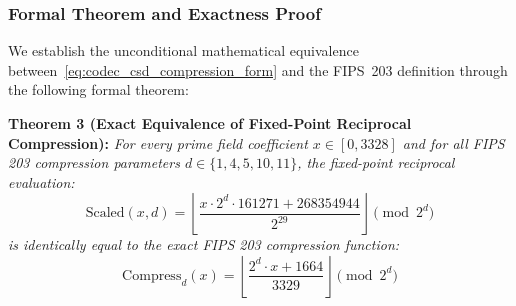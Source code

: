\subsubsection{Formal Theorem and Exactness Proof}
We establish the unconditional mathematical equivalence between~\eqref{eq:codec_csd_compression_form} and the FIPS~203 definition through the following formal theorem:

\vspace{4pt}
\noindent\textbf{Theorem 3 (Exact Equivalence of Fixed-Point Reciprocal Compression):}
\textit{For every prime field coefficient $x \in [0, 3328]$ and for all FIPS 203 compression parameters $d \in \{1, 4, 5, 10, 11\}$, the fixed-point reciprocal evaluation:}
\begin{equation}
\label{eq:codec_theorem3_stmt}
\text{Scaled}(x, d) = \left\lfloor \frac{x \cdot 2^d \cdot 161271 + 268354944}{2^{29}} \right\rfloor \pmod{2^d}
\end{equation}
\textit{is identically equal to the exact FIPS 203 compression function:}
\begin{equation}
\text{Compress}_d(x) = \left\lfloor \frac{2^d \cdot x + 1664}{3329} \right\rfloor \pmod{2^d}
\end{equation}

